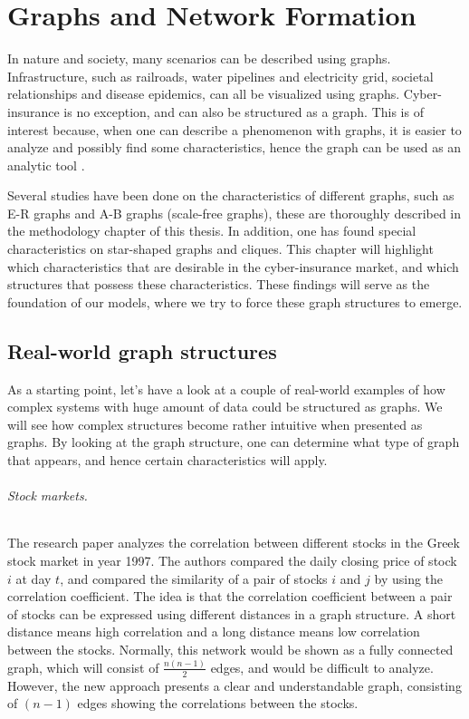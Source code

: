 \chapter{Graphs and Network Formation}
\label{chp:graphTheory} 

In nature and society, many scenarios can be described using graphs. Infrastructure, such as railroads, water pipelines and electricity grid, societal relationships and disease epidemics, can all be visualized using graphs. Cyber-insurance is no exception, and can also be structured as a graph. This is of interest because, when one can describe a phenomenon with graphs, it is easier to analyze and possibly find some characteristics, hence the graph can be used as an analytic tool \cite{audestad}. 

Several studies have been done on the characteristics of different graphs, such as E-R graphs and A-B graphs (scale-free graphs), these are thoroughly described in the methodology chapter of this thesis. In addition, one has found special characteristics on star-shaped graphs and cliques. This chapter will highlight which characteristics that are desirable in the cyber-insurance market, and which structures that possess these characteristics. These findings will serve as the foundation of our models, where we try to force these graph structures to emerge.
 
\section{Real-world graph structures}
As a starting point, let's have a look at a couple of real-world examples of how complex systems with huge amount of data could be structured as graphs. We will see how complex structures become rather intuitive when presented as graphs. By looking at the graph structure, one can determine what type of graph that appears, and hence certain characteristics will apply.  

\subparagraph{Stock markets.} The research paper \cite{greekStockMarket} analyzes the correlation between different stocks in the Greek stock market in year 1997. The authors compared the daily closing price of stock $i$ at day $t$, and compared the similarity of a pair of stocks $i$ and $j$ by using the correlation coefficient. The idea is that the correlation coefficient between a pair of stocks can be expressed using different distances in a graph structure. A short distance means high correlation and a long distance means low correlation between the stocks. Normally, this network would be shown as a fully connected graph, which will consist of $\frac{n(n-1)}{2}$ edges, and would be difficult to analyze. However, the new approach presents a clear and understandable graph, consisting of $(n-1)$ edges showing the correlations between the stocks.

